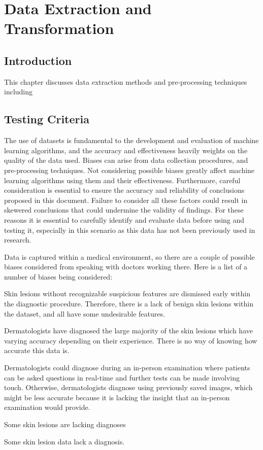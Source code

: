 \chapter{Data Extraction and Transformation}

\section{Introduction}
This chapter discusses data extraction methods and pre-processing techniques including 

\section{Testing Criteria}
The use of datasets is fundamental to the development and evaluation of machine learning algorithms, and the accuracy and effectiveness heavily weights on the quality of the data used. Biases can arise from data collection procedures, and pre-processing techniques. Not considering possible biases greatly affect machine learning algorithms using them and their effectiveness. Furthermore, careful consideration is essential to ensure the accuracy and reliability of conclusions proposed in this document. Failure to consider all these factors could result in skewered conclusions that could undermine the validity of findings. For these reasons it is essential to carefully identify and evaluate data before using and testing it, especially in this scenario as this data has not been previously used in research.

Data is captured within a medical environment, so there are a couple of possible biases considered from speaking with doctors working there. Here is a list of a number of biases being considered:
\begin{itemsize}
    \item Skin lesions without recognizable suspicious features are dismissed early within the diagnostic procedure. Therefore, there is a lack of benign skin lesions within the dataset, and all have some undesirable features.
    \item Dermatologists have diagnosed the large majority of the skin lesions which have varying accuracy depending on their experience. There is no way of knowing how accurate this data is.
    \item Dermatologists could diagnose during an in-person examination where patients can be asked questions in real-time and further tests can be made involving touch. Otherwise, dermatologists diagnose using previously saved images, which might be less accurate because it is lacking the insight that an in-person examination would provide.
    \item Some skin lesions are lacking diagnoses
\end{itemsize}

    Some skin lesion data lack a diagnosis. 

